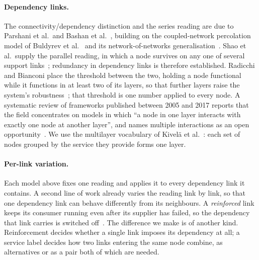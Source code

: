 \documentclass{svproc}
\begin{document}
\paragraph{Dependency links.}
The connectivity/dependency distinction and the series reading are due to
Parshani et al.\ and Bashan et al.~\cite{parshani_critical_2011,bashan_percolation_2011},
building on the coupled-network percolation model of Buldyrev et
al.~\cite{buldyrev_catastrophic_2010} and its network-of-networks
generalisation~\cite{gao_networks_2012}. Shao et al.\ supply the parallel
reading, in which a node survives on any one of several support
links~\cite{shao_cascade_2011}; redundancy in dependency links is therefore
established. Radicchi and Bianconi place the threshold between the
two, holding a node functional while it functions in at least two of its layers,
so that further layers raise the system's
robustness~\cite{radicchi_redundant_2017}; that threshold is one number applied
to every node. A systematic review of frameworks published between 2005 and 2017
reports that the field concentrates on models in which ``a node in one layer
interacts with exactly one node at another layer'', and names multiple
interactions as an open opportunity~\cite{bachmann_survey_2020}. We use the
multilayer vocabulary of Kivel\"a et al.~\cite{kivela_multilayer_2014}: each set of nodes
grouped by the service they provide forms one layer.

\paragraph{Per-link variation.}
Each model above fixes one reading and applies it to every dependency link it
contains. A second line of work already varies the reading link by link, so that
one dependency link can behave differently from its neighbours. A
\emph{reinforced} link keeps its consumer running even after its supplier has
failed, so the dependency that link carries is switched
off~\cite{zhang_percolation_2024,li_percolation_2022}. The difference we make is
of another kind. Reinforcement decides whether a single link imposes its
dependency at all; a service label decides how two links entering the same node
combine, as alternatives or as a pair both of which are needed.
\end{document}
